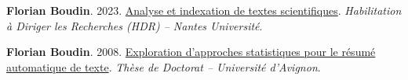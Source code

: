\item
\textbf{Florian Boudin}.
2023.
\href{https://theses.hal.science/tel-04137160}{Analyse et indexation de textes scientifiques}.
\textit{Habilitation à Diriger les Recherches (HDR) -- Nantes Université}.
\label{boudin-2023-analyse}

\item 
\textbf{Florian Boudin}.
2008.
\href{https://theses.hal.science/tel-00419469}{Exploration d’approches statistiques pour le résumé automatique de texte}.
\textit{Thèse de Doctorat -- Université d’Avignon}.
\label{boudin-2008-exploration}